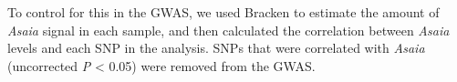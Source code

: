\documentclass[a4paper,12pt]{article}
\begin{document}
To control for this in the GWAS, we used Bracken \parencite{Lu17} to estimate the amount of \textit{Asaia} signal in each sample, and then calculated the correlation between \textit{Asaia} levels and each SNP in the analysis. SNPs that were correlated with \textit{Asaia} (uncorrected \textit{P} < 0.05) were removed from the GWAS. 


\clearpage

\printbibliography
\end{document}
